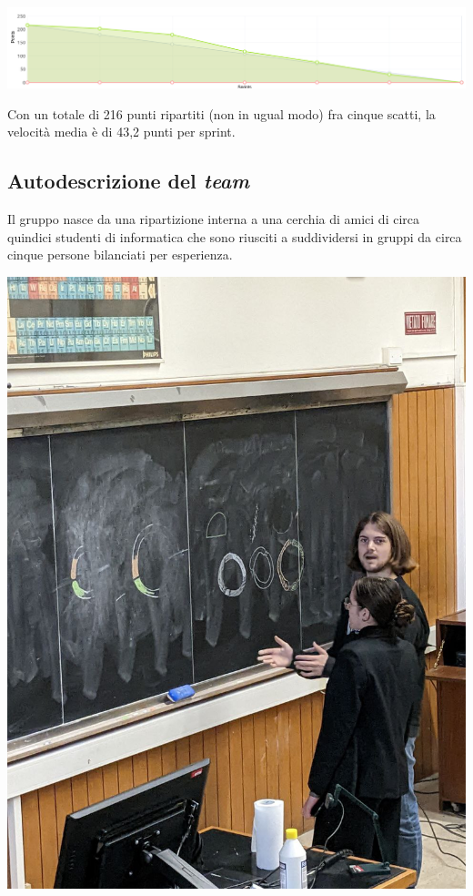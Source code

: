 \documentclass{article}
\begin{document}
\includegraphics[width=\textwidth]{burndown}

Con un totale di 216 punti ripartiti (non in ugual modo) fra cinque scatti, la
velocità media è di 43,2 punti per sprint.

\subsection{Autodescrizione del \emph{team}}

Il gruppo nasce da una ripartizione interna a una cerchia di amici di circa
quindici studenti di informatica che sono riusciti a suddividersi in gruppi da
circa cinque persone bilanciati per esperienza.

\includegraphics[width=\textwidth]{ui-team}
\end{document}
